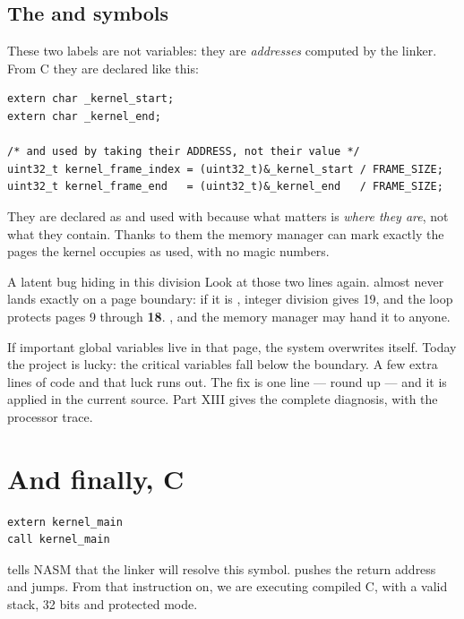 \subsection{The  and  symbols}

These two labels are not variables: they are \emph{addresses} computed by the linker. From C they
are declared like this:

\begin{lstlisting}[style=c]
extern char _kernel_start;
extern char _kernel_end;

/* and used by taking their ADDRESS, not their value */
uint32_t kernel_frame_index = (uint32_t)&_kernel_start / FRAME_SIZE;
uint32_t kernel_frame_end   = (uint32_t)&_kernel_end   / FRAME_SIZE;
\end{lstlisting}

They are declared as  and used with \cod{\&} because what matters is \emph{where they
are}, not what they contain. Thanks to them the memory manager can mark exactly the pages the
kernel occupies as used, with no magic numbers.

\begin{danger}{A latent bug hiding in this division}
Look at those two lines again.  almost never lands exactly on a page boundary:
if it is , integer division gives 19, and the loop protects pages 9 through
\textbf{18}. , and the memory manager may hand it to anyone.

If important global variables live in that page, the system overwrites itself. Today the project
is lucky: the critical variables fall below the boundary. A few extra lines of code and that luck
runs out. The fix is one line --- round up --- and it is applied in the current source. Part XIII
gives the complete diagnosis, with the
processor trace.
\end{danger}

\section{And finally, C}

\begin{lstlisting}[style=asm]
extern kernel_main
call kernel_main
\end{lstlisting}

 tells NASM that the linker will resolve this symbol.  pushes the return
address and jumps. From that instruction on, we are executing compiled C, with a valid stack, 32
bits and protected mode.

